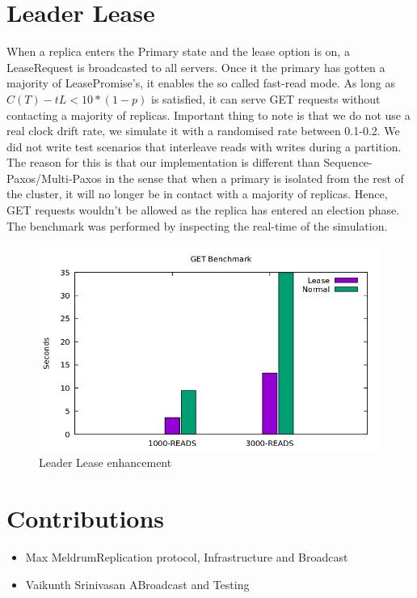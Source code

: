 \documentclass[12pt]{article}
\begin{document}
\section{Leader Lease}
When a replica enters the Primary state and the lease option is on, a LeaseRequest is broadcasted to all servers. Once it the primary has gotten a majority of LeasePromise's, it enables the so called fast-read mode. As long as \(C(T) - tL < 10*(1-p)\) is satisfied, it can serve GET requests without contacting a majority of replicas. Important thing to note is that we do not use a real clock drift rate, we simulate it with a randomised rate between 0.1-0.2.
\newline{}\newline{}
We did not write test scenarios that interleave reads with writes during a partition. The reason for this is that our implementation is different than Sequence-Paxos/Multi-Paxos in the sense that when a primary is isolated from the rest of the cluster, it will no longer be in contact with a majority of replicas. Hence, GET requests wouldn't be allowed as the replica has entered an election phase. The benchmark was performed by inspecting the real-time of the simulation.
\begin{figure}[H]
  \centering
  \includegraphics[scale=0.5]{img/benchmark.png}
  \caption[Caption for LOF]{Leader Lease enhancement}  
  \label{fig:picture}
\end{figure}

\section{Contributions}

\begin{itemize}
	\item{Max Meldrum\newline{}\newline{}Replication protocol, Infrastructure and Broadcast}
	\item{Vaikunth Srinivasan A\newline{}\newline{}Broadcast and Testing}

\end{itemize}


\end{document}
